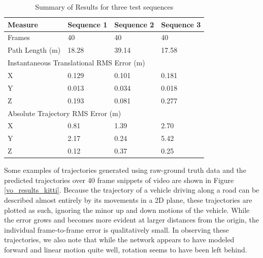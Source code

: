\begin{table}[tbp]

    \caption{Summary of Results for three test sequences}
    \centering
    \begin{tabular}{@{}llll@{}}
        \toprule
        Measure            & Sequence 1    & Sequence 2   & Sequence 3  \\ \midrule
        Frames             & 40            & 40           & 40          \\
        Path Length (m)    & 18.28         & 39.14        & 17.58       \\ \midrule
        \multicolumn{4}{l}{Instantaneous Translational RMS Error (m)}   \\
        X                  & 0.129         & 0.101        & 0.181       \\
        Y                  & 0.013         & 0.034        & 0.018       \\
        Z                  & 0.193         & 0.081        & 0.277       \\ \midrule
        \multicolumn{4}{l}{Absolute Trajectory RMS Error (m)} \\
        X                  &  0.81         & 1.39         & 2.70        \\
        Y                  &  2.17         & 0.24         & 5.42        \\
        Z                  &  0.12         & 0.37         & 0.25        \\ \bottomrule
    
        \end{tabular}
        \label{kitti_vo_results_tabular}
    \end{table}



Some examples of trajectories generated using raw-ground truth data and the predicted trajectories over 40 frame snippets of video are shown in Figure \ref{vo_results_kitti}. Because the trajectory of a vehicle driving along a road can be described almost entirely by its movements in a 2D plane, these trajectories are plotted as such, ignoring the minor up and down motions of the vehicle. While the error grows and becomes more evident at larger distances from the origin, the individual frame-to-frame error is qualitatively small. In observing these trajectories, we also note that while the network appears to have modeled forward and linear motion quite well, rotation seems to have been left behind. 

